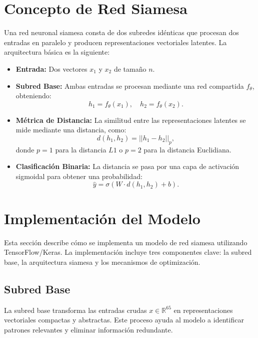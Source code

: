 \section{Concepto de Red Siamesa}

Una red neuronal siamesa consta de dos subredes idénticas que procesan dos entradas en paralelo y producen representaciones vectoriales latentes. La arquitectura básica es la siguiente:
\begin{itemize}
    \item \textbf{Entrada:} Dos vectores \(x_1\) y \(x_2\) de tamaño \(n\).
    \item \textbf{Subred Base:} Ambas entradas se procesan mediante una red compartida \(f_\theta\), obteniendo:
    \[
    h_1 = f_\theta(x_1), \quad h_2 = f_\theta(x_2).
    \]
    \item \textbf{Métrica de Distancia:} La similitud entre las representaciones latentes se mide mediante una distancia, como:
    \[
    d(h_1, h_2) = ||h_1 - h_2||_p,
    \]
    donde \(p = 1\) para la distancia \(L1\) o \(p = 2\) para la distancia Euclidiana.
    \item \textbf{Clasificación Binaria:} La distancia se pasa por una capa de activación sigmoidal para obtener una probabilidad:
    \[
    \hat{y} = \sigma(W \cdot d(h_1, h_2) + b).
    \]
\end{itemize}

\section{Implementación del Modelo}

Esta sección describe cómo se implementa un modelo de red siamesa utilizando TensorFlow/Keras. La implementación incluye tres componentes clave: la subred base, la arquitectura siamesa y los mecanismos de optimización.

\subsection{Subred Base}

La subred base transforma las entradas crudas \( x \in \mathbb{R}^{65} \) en representaciones vectoriales compactas y abstractas. Este proceso ayuda al modelo a identificar patrones relevantes y eliminar información redundante.

